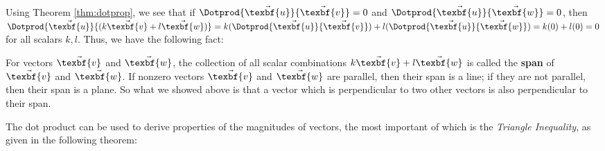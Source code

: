 Using Theorem \ref{thm:dotprop}, we see that if $\Dotprod{\vec{\texbf{u}}}{\vec{\texbf{v}}} = 0$ and
$\Dotprod{\vec{\texbf{u}}}{\vec{\texbf{w}}} = 0$, then $\Dotprod{\vec{\texbf{u}}}{(k\vec{\texbf{v}} + l\vec{\texbf{w}})} =
k(\Dotprod{\vec{\texbf{u}}}{\vec{\texbf{v}}}) + l(\Dotprod{\vec{\texbf{u}}}{\vec{\texbf{w}}}) = k(0) + l(0) =0$ for all scalars $k, l$.
Thus, we have the following fact:\vspace{2mm}

\vspace{2mm}
For vectors $\vec{\texbf{v}}$ and $\vec{\texbf{w}}$, the collection of all scalar combinations $k\vec{\texbf{v}} + l\vec{\texbf{w}}$
is called the \textbf{span} of $\vec{\texbf{v}}$ and $\vec{\texbf{w}}$. If nonzero vectors $\vec{\texbf{v}}$ and $\vec{\texbf{w}}$ are
parallel, then their span is a line; if they are not parallel, then their span is a plane. So what we showed above is
that a vector which is perpendicular to two other vectors is also perpendicular to their span.

The dot product can be used to derive properties of the magnitudes of vectors, the most important of which is the
\emph{Triangle Inequality}, as given in the following theorem:


